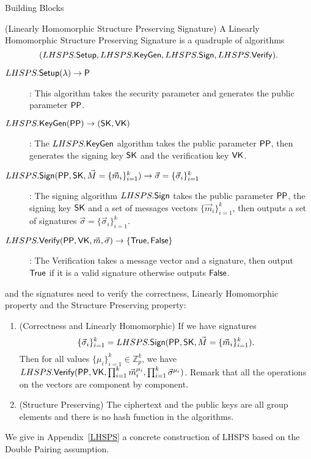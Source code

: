\begin{subsection}{Building Blocks}
  \begin{myDef}{(Linearly Homomorphic Structure Preserving Signature)}
    A Linearly Homomorphic Structure Preserving Signature is a quadruple of algorithms
    $$(LHSPS.{\mathsf{Setup}}, LHSPS.{\mathsf{KeyGen}}, LHSPS.{\mathsf{Sign}}, LHSPS.{\mathsf{Verify}}).$$
    \begin{description}
    \item[$\boldmath{LHSPS.{\mathsf{Setup}}(\lambda) \to \mathsf{P}}$]: This algorithm takes the security parameter and generates the public parameter $\mathsf{PP}$.
    \item[$\boldmath{LHSPS.{\mathsf{KeyGen}}(\mathsf{PP}) \to (\mathsf{SK}, \mathsf{VK})}$]: The $LHSPS.{\mathsf{KeyGen}}$ algorithm takes the public parameter $\mathsf{PP}$, then generates the signing key $\mathsf{SK}$ and the verification key $\mathsf{VK}$.
    \item[$\boldmath{LHSPS.{\mathsf{Sign}}(\mathsf{PP}, \mathsf{SK}, \vec{M} = \{\vec{m}_i\}_{i=1}^k) \to \vec{\sigma} = \{\vec{\sigma}_i\}_{i=1}^k}$]: The signing algorithm $LHSPS.{\mathsf{Sign}}$ takes the public parameter $\mathsf{PP}$, the signing key $\mathsf{SK}$ and a set of messages vectors $\{\vec{m}_i\}_{i=1}^k$, then outputs a set of signatures $\vec{\sigma} = \{\vec{\sigma}_i\}_{i=1}^k$.
    \item[$\boldmath{LHSPS.{\mathsf{Verify}}(\mathsf{PP}, \mathsf{VK}, \vec{m}, \vec{\sigma}) \to \{\mathsf{True}, \mathsf{False}\}}$]: The Verification takes a message vector and a signature, then output $\mathsf{True}$ if it is a valid signature otherwise outputs $\mathsf{False}$.
    \end{description}

    and the signatures need to verify the correctness, Linearly Homomorphic property and the Structure Preserving property:
    \begin{enumerate}
    \item (Correctness and Linearly Homomorphic) If we have signatures
      $$\{\vec{\sigma}_i\}_{i=1}^k = LHSPS.{\mathsf{Sign}}(\mathsf{PP}, \mathsf{SK}, \vec{M} = \{\vec{m}_i\}_{i=1}^k).$$
      Then for all values $\{\mu_i\}_{i = 1}^k \in \mathbb{Z}_p^k$,
      we have $LHSPS.{\mathsf{Verify}}(\mathsf{PP}, \mathsf{VK}, \prod_{i=1}^k\vec{m}_i^{\mu_i}, \prod_{i=1}^k\vec{\sigma}^{\mu_i})$. Remark that all the operations on the vectors are component by component.
    \item (Structure Preserving) The ciphertext and the public keys are all group elements and there is no hash function in the algorithms.
    \end{enumerate}
  \end{myDef}

  We give in Appendix~\ref{LHSPS} a concrete construction of LHSPS based on the Double Pairing assumption.


\end{subsection}
